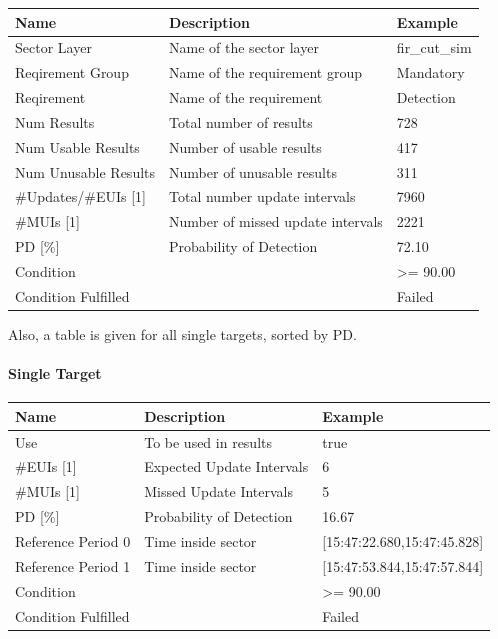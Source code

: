 \begin{center}
 \begin{table}[H]
  \begin{tabularx}{\textwidth}{ | l | X |  l | }
    \hline
    \textbf{Name} & \textbf{Description} & \textbf{Example} \\ \hline
    Sector Layer & Name of the sector layer & fir\_cut\_sim \\ \hline
    Reqirement Group & Name of the requirement group & Mandatory  \\ \hline
    Reqirement & Name of the requirement & Detection  \\ \hline
    Num Results & Total number of results & 728  \\ \hline
    Num Usable Results & Number of usable results & 417  \\ \hline
    Num Unusable Results & Number of unusable results & 311  \\ \hline
    \#Updates/\#EUIs [1] & Total number update intervals & 7960  \\ \hline
    \#MUIs [1] & Number of missed update intervals & 2221  \\ \hline
    PD [\%] & Probability of Detection & 72.10  \\ \hline
    Condition &  & >= 90.00  \\ \hline
    Condition Fulfilled &  & Failed  \\ \hline
\end{tabularx}
\end{table}
\end{center}

Also, a table is given for all single targets, sorted by PD.

\paragraph{Single Target}

\begin{center}
 \begin{table}[H]
  \begin{tabularx}{\textwidth}{ | l | X |  l | }
    \hline
    \textbf{Name} & \textbf{Description} & \textbf{Example} \\ \hline
    Use & To be used in results & true \\ \hline
    \#EUIs [1] & Expected Update Intervals & 6 \\ \hline
    \#MUIs [1] & Missed Update Intervals & 5 \\ \hline
    PD [\%] & Probability of Detection & 16.67 \\ \hline
    Reference Period 0 & Time inside sector & [15:47:22.680,15:47:45.828] \\ \hline
    Reference Period 1 & Time inside sector & [15:47:53.844,15:47:57.844] \\ \hline
    Condition &  & >= 90.00 \\ \hline
    Condition Fulfilled &  & Failed \\ \hline
\end{tabularx}
\end{table}
\end{center}

